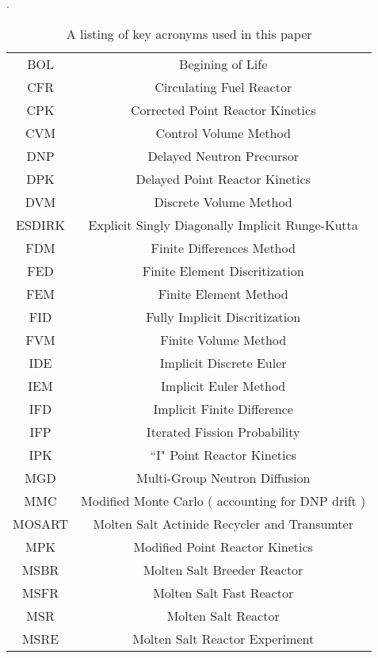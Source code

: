 \documentclass[review]{elsarticle}
\begin{document}
\begin{table}[h]
    \caption{A listing of key acronyms used in this paper}.
    \label{tbl:nomen}
    \begin{center}
        \begin{tabular}{|c c|}
            \hline
            BOL & Begining of Life \\
            CFR & Circulating Fuel Reactor \\
            CPK & Corrected Point Reactor Kinetics \\
            CVM & Control Volume Method \\
            DNP & Delayed Neutron Precursor \\
            DPK & Delayed Point Reactor Kinetics \\
            DVM & Discrete Volume Method \\
            ESDIRK & Explicit Singly Diagonally Implicit Runge-Kutta \\
            FDM & Finite Differences Method \\
            FED & Finite Element Discritization \\
            FEM & Finite Element Method \\
            FID & Fully Implicit Discritization \\
            FVM & Finite Volume Method \\
            IDE & Implicit Discrete Euler \\
            IEM & Implicit Euler Method \\
            IFD & Implicit Finite Difference \\
            IFP & Iterated Fission Probability \\
            IPK & ``I" Point Reactor Kinetics \\
            MGD & Multi-Group Neutron Diffusion \\
            MMC & Modified Monte Carlo ( accounting for DNP drift ) \\
            MOSART & Molten Salt Actinide Recycler and Transumter \\
            MPK & Modified Point Reactor Kinetics \\
            MSBR & Molten Salt Breeder Reactor \\
            MSFR & Molten Salt Fast Reactor \\
            MSR & Molten Salt Reactor \\
            MSRE & Molten Salt Reactor Experiment \\

\end{tabular}
\end{center}
\end{table}
\end{document}
